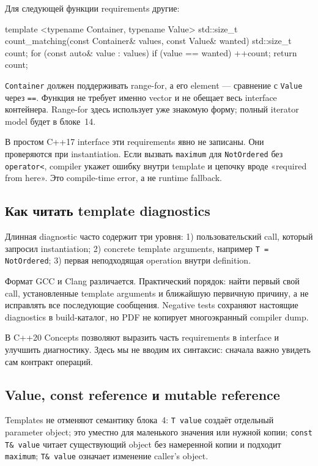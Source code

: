 Для следующей функции requirements другие:

\begin{cppcode}
template <typename Container, typename Value>
std::size_t count_matching(const Container& values, const Value& wanted) {
    std::size_t count{};
    for (const auto& value : values) {
        if (value == wanted) {
            ++count;
        }
    }
    return count;
}
\end{cppcode}

\texttt{Container} должен поддерживать range-for, а его element --- сравнение
с \texttt{Value} через \texttt{==}. Функция не требует именно vector и не
обещает весь interface контейнера. Range-for здесь использует уже знакомую
форму; полный iterator model будет в блоке~14.

В простом C++17 interface эти requirements явно не записаны. Они проверяются
при instantiation. Если вызвать \texttt{maximum} для \texttt{NotOrdered} без
\texttt{operator<}, compiler укажет ошибку внутри template и цепочку вроде
«required from here». Это compile-time error, а не runtime fallback.

\subsection{Как читать template diagnostics}

Длинная diagnostic часто содержит три уровня:
1) пользовательский call, который запросил instantiation; 2) concrete template arguments, например \texttt{T = NotOrdered}; 3) первая неподходящая operation внутри definition.

Формат GCC и Clang различается. Практический порядок: найти первый свой call,
установленные template arguments и ближайшую первичную причину, а не исправлять
все последующие сообщения. Negative tests сохраняют настоящие diagnostics в
build-каталог, но PDF не копирует многоэкранный compiler dump.

В C++20 Concepts позволяют выразить часть requirements в interface и улучшить
диагностику. Здесь мы не вводим их синтаксис: сначала важно увидеть сам
контракт операций.

\subsection{Value, const reference и mutable reference}

Templates не отменяют семантику блока~4:
\texttt{T value} создаёт отдельный parameter object; это уместно для маленького значения или нужной копии; \texttt{const T\& value} читает существующий object без намеренной копии и подходит \texttt{maximum}; \texttt{T\& value} означает изменение caller's object.

